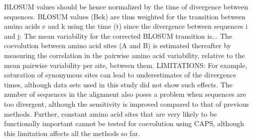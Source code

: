 		BLOSUM values should be hence normalized by the time of divergence between sequences. BLOSUM values (Bek) are thus weighted for the transition between amino acids e and k using the time (t) since the divergence between sequences i and j: \cite{fares2006novel}
		The mean variability for the corrected BLOSUM transition is... \cite{fares2006novel}
		The coevolution between amino acid sites (A and B) is estimated thereafter by measuring the correlation in the pairwise amino acid variability, relative to the mean pairwise variability per site, between them. \cite{fares2006novel}
	LIMITATIONS:  \cite{fares2006novel}
		For example, saturation of synonymous sites can lead to underestimates of the divergence times, although data sets used in this study did not show such effects. \cite{fares2006novel}
		The number of sequences in the alignment also poses a problem when sequences are too divergent, although the sensitivity is improved compared to that of previous methods.  \cite{fares2006novel}
		Further, constant amino acid sites that are very likely to be functionally important cannot be tested for coevolution using CAPS, although this limitation affects all the methods so far. \cite{fares2006novel}



